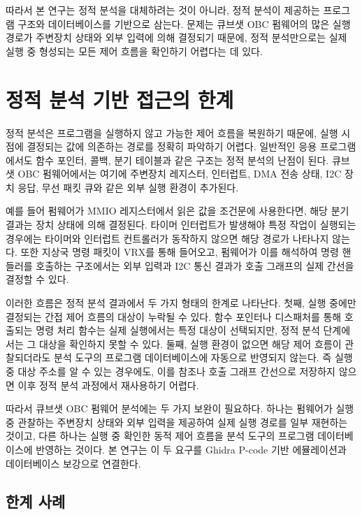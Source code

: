 \documentclass[master,korean,final]{kaist-ucs}
\begin{document}
따라서 본 연구는 정적 분석을 대체하려는 것이 아니라, 정적 분석이 제공하는 프로그램 구조와 데이터베이스를 기반으로 삼는다. 문제는 큐브샛 OBC 펌웨어의 많은 실행 경로가 주변장치 상태와 외부 입력에 의해 결정되기 때문에, 정적 분석만으로는 실제 실행 중 형성되는 모든 제어 흐름을 확인하기 어렵다는 데 있다.

\section{정적 분석 기반 접근의 한계}

정적 분석은 프로그램을 실행하지 않고 가능한 제어 흐름을 복원하기 때문에, 실행 시점에 결정되는 값에 의존하는 경로를 정확히 파악하기 어렵다. 일반적인 응용 프로그램에서도 함수 포인터, 콜백, 분기 테이블과 같은 구조는 정적 분석의 난점이 된다. 큐브샛 OBC 펌웨어에서는 여기에 주변장치 레지스터, 인터럽트, DMA 전송 상태, I2C 장치 응답, 무선 패킷 큐와 같은 외부 실행 환경이 추가된다.

예를 들어 펌웨어가 MMIO 레지스터에서 읽은 값을 조건문에 사용한다면, 해당 분기 결과는 장치 상태에 의해 결정된다. 타이머 인터럽트가 발생해야 특정 작업이 실행되는 경우에는 타이머와 인터럽트 컨트롤러가 동작하지 않으면 해당 경로가 나타나지 않는다. 또한 지상국 명령 패킷이 VRX를 통해 들어오고, 펌웨어가 이를 해석하여 명령 핸들러를 호출하는 구조에서는 외부 입력과 I2C 통신 결과가 호출 그래프의 실제 간선을 결정할 수 있다.

이러한 흐름은 정적 분석 결과에서 두 가지 형태의 한계로 나타난다. 첫째, 실행 중에만 결정되는 간접 제어 흐름의 대상이 누락될 수 있다. 함수 포인터나 디스패처를 통해 호출되는 명령 처리 함수는 실제 실행에서는 특정 대상이 선택되지만, 정적 분석 단계에서는 그 대상을 확인하지 못할 수 있다. 둘째, 실행 환경이 없으면 해당 제어 흐름이 관찰되더라도 분석 도구의 프로그램 데이터베이스에 자동으로 반영되지 않는다. 즉 실행 중 대상 주소를 알 수 있는 경우에도, 이를 참조나 호출 그래프 간선으로 저장하지 않으면 이후 정적 분석 과정에서 재사용하기 어렵다.

따라서 큐브샛 OBC 펌웨어 분석에는 두 가지 보완이 필요하다. 하나는 펌웨어가 실행 중 관찰하는 주변장치 상태와 외부 입력을 제공하여 실제 실행 경로를 일부 재현하는 것이고, 다른 하나는 실행 중 확인한 동적 제어 흐름을 분석 도구의 프로그램 데이터베이스에 반영하는 것이다. 본 연구는 이 두 요구를 Ghidra P-code 기반 에뮬레이션과 데이터베이스 보강으로 연결한다.

\subsection{한계 사례}
\end{document}
